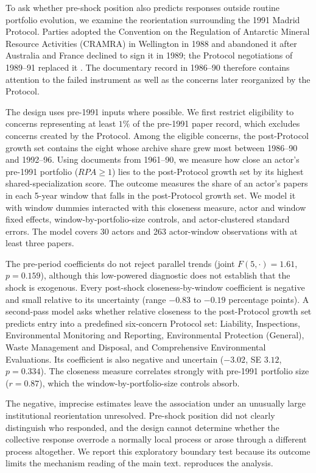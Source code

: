 \documentclass{fun_article}
\begin{document}
To ask whether pre-shock position also predicts responses outside routine portfolio evolution, we examine the reorientation surrounding the 1991 Madrid Protocol. Parties adopted the Convention on the Regulation of Antarctic Mineral Resource Activities (CRAMRA) in Wellington in 1988 and abandoned it after Australia and France declined to sign it in 1989; the Protocol negotiations of 1989--91 replaced it \cite{Joyner1998}. The documentary record in 1986--90 therefore contains attention to the failed instrument as well as the concerns later reorganized by the Protocol.

The design uses pre-1991 inputs where possible. We first restrict eligibility to concerns representing at least $1\%$ of the pre-1991 paper record, which excludes concerns created by the Protocol. Among the eligible concerns, the post-Protocol growth set contains the eight whose archive share grew most between 1986--90 and 1992--96. Using documents from 1961--90, we measure how close an actor's pre-1991 portfolio ($RPA \ge 1$) lies to the post-Protocol growth set by its highest shared-specialization score. The outcome measures the share of an actor's papers in each 5-year window that falls in the post-Protocol growth set. We model it with window dummies interacted with this closeness measure, actor and window fixed effects, window-by-portfolio-size controls, and actor-clustered standard errors. The model covers 30 actors and 263 actor-window observations with at least three papers.

The pre-period coefficients do not reject parallel trends (joint $F(5,\cdot)=1.61$, $p=0.159$), although this low-powered diagnostic does not establish that the shock is exogenous. Every post-shock closeness-by-window coefficient is negative and small relative to its uncertainty (range $-0.83$ to $-0.19$ percentage points). A second-pass model asks whether relative closeness to the post-Protocol growth set predicts entry into a predefined six-concern Protocol set: Liability, Inspections, Environmental Monitoring and Reporting, Environmental Protection (General), Waste Management and Disposal, and Comprehensive Environmental Evaluations. Its coefficient is also negative and uncertain ($-3.02$, SE $3.12$, $p=0.334$). The closeness measure correlates strongly with pre-1991 portfolio size ($r=0.87$), which the window-by-portfolio-size controls absorb.

The negative, imprecise estimates leave the association under an unusually large institutional reorientation unresolved. Pre-shock position did not clearly distinguish who responded, and the design cannot determine whether the collective response overrode a normally local process or arose through a different process altogether. We report this exploratory boundary test because its outcome limits the mechanism reading of the main text. \texttt{} reproduces the analysis.
\end{document}
